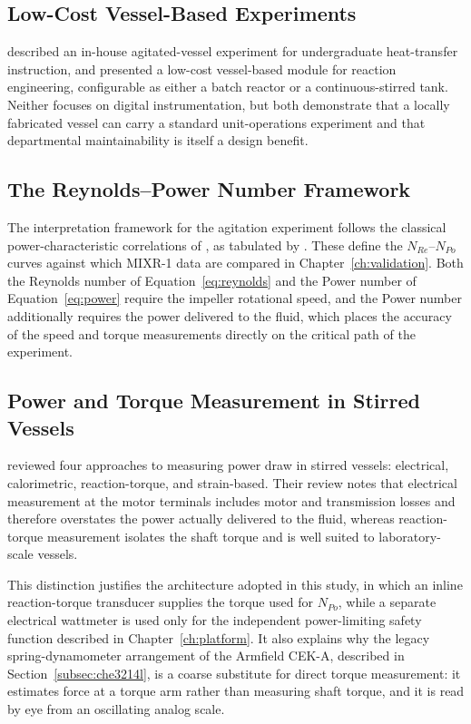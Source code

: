 \subsection{Low-Cost Vessel-Based Experiments}
\label{subsec:rrl-vessels}

\citet{nassar2011} described an in-house agitated-vessel experiment for undergraduate heat-transfer instruction, and \citet{ganley2015} presented a low-cost vessel-based module for reaction engineering, configurable as either a batch reactor or a continuous-stirred tank. Neither focuses on digital instrumentation, but both demonstrate that a locally fabricated vessel can carry a standard unit-operations experiment and that departmental maintainability is itself a design benefit.

\subsection{The Reynolds--Power Number Framework}
\label{subsec:rrl-correlations}

The interpretation framework for the agitation experiment follows the classical power-characteristic correlations of \citet{rushton1950}, as tabulated by \citet{brown1950}. These define the $N_{Re}$--$N_{Po}$ curves against which MIXR-1 data are compared in Chapter~\ref{ch:validation}. Both the Reynolds number of Equation~\ref{eq:reynolds} and the Power number of Equation~\ref{eq:power} require the impeller rotational speed, and the Power number additionally requires the power delivered to the fluid, which places the accuracy of the speed and torque measurements directly on the critical path of the experiment.

\subsection{Power and Torque Measurement in Stirred Vessels}
\label{subsec:rrl-torque-methods}

\citet{ascanio2004} reviewed four approaches to measuring power draw in stirred vessels: electrical, calorimetric, reaction-torque, and strain-based. Their review notes that electrical measurement at the motor terminals includes motor and transmission losses and therefore overstates the power actually delivered to the fluid, whereas reaction-torque measurement isolates the shaft torque and is well suited to laboratory-scale vessels.

This distinction justifies the architecture adopted in this study, in which an inline reaction-torque transducer supplies the torque used for $N_{Po}$, while a separate electrical wattmeter is used only for the independent power-limiting safety function described in Chapter~\ref{ch:platform}. It also explains why the legacy spring-dynamometer arrangement of the Armfield CEK-A, described in Section~\ref{subsec:che3214l}, is a coarse substitute for direct torque measurement: it estimates force at a torque arm rather than measuring shaft torque, and it is read by eye from an oscillating analog scale.



